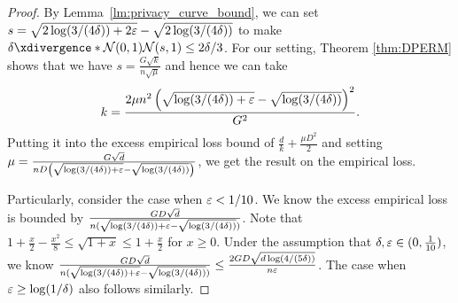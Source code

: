 \begin{proof}

By Lemma~\ref{lm:privacy_curve_bound}, we can set $s=\sqrt{2\log(3/(4\delta))+2\varepsilon}-\sqrt{2\log(3/(4\delta))}$ to make $\deltacurve{\cN(0,1)}{\cN(s,1)}\leq2\delta/3$.
For our setting, Theorem \ref{thm:DPERM} shows that we have $s=\frac{G\sqrt{k}}{n\sqrt{\mu}}$
and hence we can take
\begin{align*}
    k=\frac{2\mu n^{2}\left(\sqrt{\log(3/(4\delta))+\varepsilon}-\sqrt{\log(3/(4\delta))}\right)^2}{G^{2}}.
\end{align*}
Putting it into the excess empirical loss bound of $\frac{d}{k}+\frac{\mu D^{2}}{2}$
and setting $\mu=\frac{G\sqrt{d}}{ n D\left(\sqrt{\log(3/(4\delta))+\varepsilon}-\sqrt{\log(3/(4\delta))}\right)}$,
we get the result on the empirical loss.

Particularly, consider the case when $\varepsilon<1/10$.
We know the excess empirical loss is bounded by $\frac{GD\sqrt{d}}{n(\sqrt{\log(3/(4\delta))+\varepsilon}-\sqrt{\log(3/(4\delta))})}$.
Note that $1+\frac{x}{2}-\frac{x^2}{8}\leq \sqrt{1+x}\leq 1+\frac{x}{2}$ for $x\geq 0$.
Under the assumption that $\delta,\varepsilon\in(0,\frac{1}{10})$, we know $\frac{GD\sqrt{d}}{n(\sqrt{\log(3/(4\delta))+\varepsilon}-\sqrt{\log(3/(4\delta))})}\leq \frac{2GD\sqrt{d\log(4/(5\delta))}}{n\varepsilon}$.
The case when $\varepsilon\geq \log(1/\delta)$ also follows similarly.


\end{proof}
